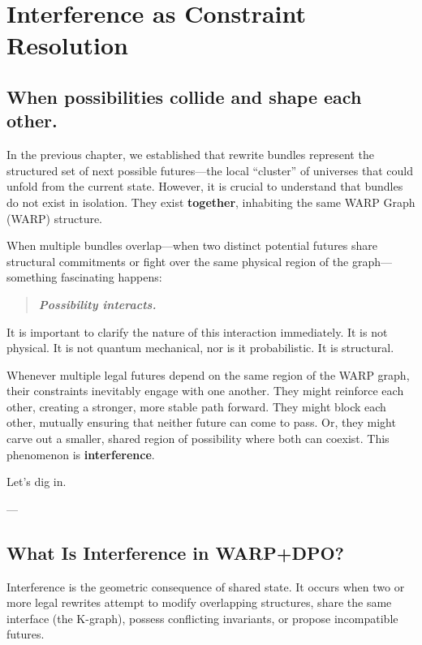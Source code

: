 \chapter{Interference as Constraint Resolution}
\label{chapter-12-interference}

\section{\texorpdfstring{\textbf{When possibilities collide and shape each other.}}{12.1 --- When possibilities collide and shape each other.}}

In the previous chapter, we established that rewrite bundles represent the structured set of next possible futures—the local ``cluster'' of universes that could unfold from the current state. However, it is crucial to understand that bundles do not exist in isolation. They exist \textbf{together}, inhabiting the same WARP Graph (WARP) structure.

When multiple bundles overlap—when two distinct potential futures share structural commitments or fight over the same physical region of the graph—something fascinating happens:

\begin{quote}
\itshape
\textbf{Possibility interacts.}
\end{quote}

It is important to clarify the nature of this interaction immediately. It is not physical. It is not quantum mechanical, nor is it probabilistic. It is structural.

Whenever multiple legal futures depend on the same region of the WARP graph, their constraints inevitably engage with one another. They might reinforce each other, creating a stronger, more stable path forward. They might block each other, mutually ensuring that neither future can come to pass. Or, they might carve out a smaller, shared region of possibility where both can coexist. This phenomenon is \textbf{interference}.

Let's dig in.

---

\section{\texorpdfstring{\textbf{What Is Interference in WARP+DPO?}}{12.2 --- What Is Interference in WARP+DPO?}}

Interference is the geometric consequence of shared state. It occurs when two or more legal rewrites attempt to modify overlapping structures, share the same interface (the K-graph), possess conflicting invariants, or propose incompatible futures.

